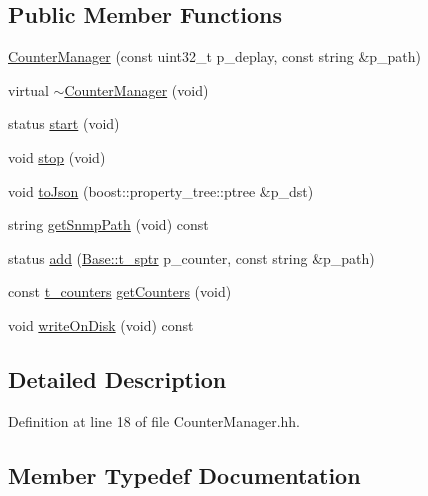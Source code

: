 \subsection*{Public Member Functions}
\begin{DoxyCompactItemize}
\item 
\hyperlink{classxtd_1_1counters_1_1CounterManager_a13c765c1d8c326d3a040c779975d0149}{Counter\+Manager} (const uint32\+\_\+t p\+\_\+deplay, const string \&p\+\_\+path)
\item 
virtual \hyperlink{classxtd_1_1counters_1_1CounterManager_aff5438182c449dd719382d2d8ca2b1c8}{$\sim$\+Counter\+Manager} (void)
\item 
status \hyperlink{classxtd_1_1counters_1_1CounterManager_a65755963d9293fa457c6562a38b2dff3}{start} (void)
\item 
void \hyperlink{classxtd_1_1counters_1_1CounterManager_a2b50e714f748fc2298bd3ca0c77c668d}{stop} (void)
\item 
void \hyperlink{classxtd_1_1counters_1_1CounterManager_a1677a12619a23ba162a19ebc74fe41e9}{to\+Json} (boost\+::property\+\_\+tree\+::ptree \&p\+\_\+dst)
\item 
string \hyperlink{classxtd_1_1counters_1_1CounterManager_a01f164d28b794064ed5cba2ab94e3583}{get\+Snmp\+Path} (void) const 
\item 
status \hyperlink{classxtd_1_1counters_1_1CounterManager_a7e0f54fa25b0d8592362159604cc4310}{add} (\hyperlink{classxtd_1_1counters_1_1Base_aa0ea634f1a5e3df87418566a3e8fcbd6}{Base\+::t\+\_\+sptr} p\+\_\+counter, const string \&p\+\_\+path)
\item 
const \hyperlink{classxtd_1_1counters_1_1CounterManager_ae675635fccfde42cc3831d07adacd2cb}{t\+\_\+counters} \hyperlink{classxtd_1_1counters_1_1CounterManager_afb314857888b269ca3ea0f2b4870b3e5}{get\+Counters} (void)
\item 
void \hyperlink{classxtd_1_1counters_1_1CounterManager_a6b9bb7cbdc06c137d04d7a944232b264}{write\+On\+Disk} (void) const 
\end{DoxyCompactItemize}


\subsection{Detailed Description}


Definition at line 18 of file Counter\+Manager.\+hh.



\subsection{Member Typedef Documentation}
